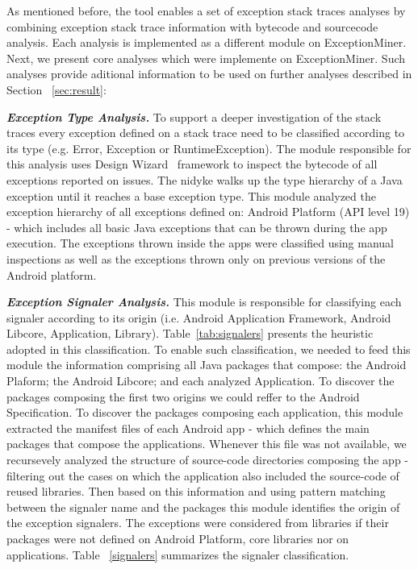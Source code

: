 \documentclass[conference]{IEEEtran}
\begin{document}
As mentioned before, the tool enables a set of exception stack traces analyses by combining exception stack 
trace information with bytecode and sourcecode analysis. Each analysis is implemented as a different module 
on ExceptionMiner. Next, we present core analyses which were implemente on ExceptionMiner. Such analyses 
provide aditional information to be used on further analyses described in Section ~\ref{sec:result}:

\emph{\textbf{Exception Type Analysis.}} To support a deeper investigation of the 
stack traces every exception defined on a stack trace need to be classified according to its type
(e.g. Error, Exception or RuntimeException). The module responsible for this analysis 
uses Design Wizard~\cite{Brunet09} framework to inspect the bytecode of all exceptions reported on issues.
The nidyke walks up the type hierarchy of a Java exception until it reaches a base exception type.
This module analyzed the exception hierarchy of all exceptions defined on:
Android Platform (API level 19) - which includes all basic Java exceptions that 
can be thrown during the app execution. The exceptions thrown inside the apps
were classified using manual inspections as well as the exceptions thrown only
on previous versions of the Android platform.

\emph{\textbf{Exception Signaler Analysis.}}
This module is responsible for classifying each signaler according 
to its origin (i.e. Android Application Framework, Android Libcore, Application, Library). 
Table~\ref{tab:signalers} presents the heuristic adopted in this classification.
To enable such classification, we needed to feed this module the information
comprising all Java packages that compose: the Android Plaform;
 the Android Libcore; and each analyzed Application. 
To discover the packages composing the first two origins
we could reffer to the Android Specification.
To discover the packages composing each application, this module 
extracted the manifest files of each Android app
 - which defines the main packages that compose the applications.
 Whenever this file was not available, we recursevely analyzed the 
structure of source-code directories composing the app
- filtering out the cases on which the application 
also included the source-code of reused libraries.
Then based on this information and using pattern matching 
between the signaler name and the packages this module identifies 
the origin of the exception signalers. The exceptions were considered
 from libraries if their packages were not defined 
on Android Platform, core libraries nor on applications.
Table ~\ref{signalers} summarizes the signaler classification.
\end{document}
